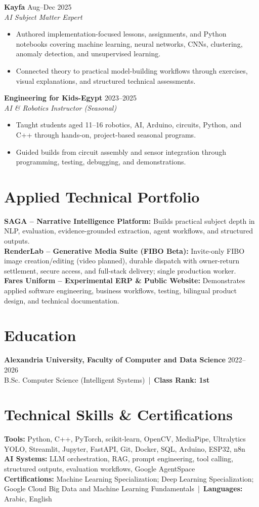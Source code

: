 \documentclass[letterpaper]{article}
\newcommand{\roleline}[3]{\textbf{#1} \hfill #2 \\\textit{#3} \\}
\begin{document}
\roleline{Kayfa}{Aug--Dec 2025}{AI Subject Matter Expert}
\begin{itemize}
\item Authored implementation-focused lessons, assignments, and Python notebooks covering machine learning, neural networks, CNNs, clustering, anomaly detection, and unsupervised learning.
\item Connected theory to practical model-building workflows through exercises, visual explanations, and structured technical assessments.
\end{itemize}

\roleline{Engineering for Kids-Egypt}{2023--2025}{AI \& Robotics Instructor (Seasonal)}
\begin{itemize}
\item Taught students aged 11--16 robotics, AI, Arduino, circuits, Python, and C++ through hands-on, project-based seasonal programs.
\item Guided builds from circuit assembly and sensor integration through programming, testing, debugging, and demonstrations.
\end{itemize}

\section*{Applied Technical Portfolio}
\textbf{SAGA -- Narrative Intelligence Platform:} Builds practical subject depth in NLP, evaluation, evidence-grounded extraction, agent workflows, and structured outputs.\\
\textbf{RenderLab -- Generative Media Suite (FIBO Beta):} Invite-only FIBO image creation/editing (video planned), durable dispatch with owner-return settlement, secure access, and full-stack delivery; single production worker.\\
\textbf{Fares Uniform -- Experimental ERP \& Public Website:} Demonstrates applied software engineering, business workflows, testing, bilingual product design, and technical documentation.

\section*{Education}
\textbf{Alexandria University, Faculty of Computer and Data Science} \hfill 2022--2026\\
B.Sc. Computer Science (Intelligent Systems) \,|\, \textbf{Class Rank: 1st}

\section*{Technical Skills \& Certifications}
\textbf{Tools:} Python, C++, PyTorch, scikit-learn, OpenCV, MediaPipe, Ultralytics YOLO, Streamlit, Jupyter, FastAPI, Git, Docker, SQL, Arduino, ESP32, n8n\\
\textbf{AI Systems:} LLM orchestration, RAG, prompt engineering, tool calling, structured outputs, evaluation workflows, Google AgentSpace\\
\textbf{Certifications:} Machine Learning Specialization; Deep Learning Specialization; Google Cloud Big Data and Machine Learning Fundamentals \,|\, \textbf{Languages:} Arabic, English
\end{document}
